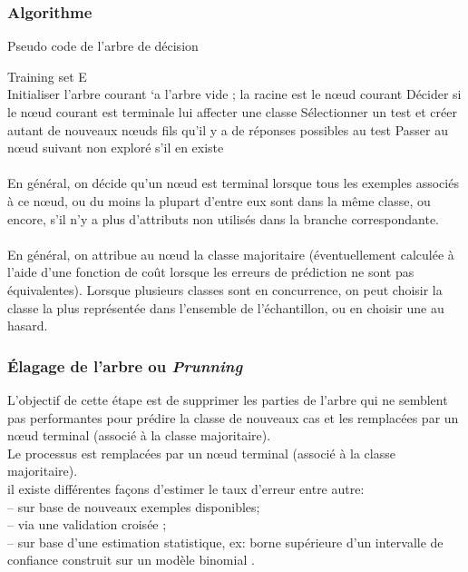 \subsubsection{Algorithme}
\begin{algorithm}
	\caption{Pseudo code de l'arbre de décision}
	\begin{algorithmic}
		\Require 
		Training set E \\
		\State Initialiser l’arbre courant `a l’arbre vide ; la racine est le nœud courant
	    \State Décider si le nœud courant est terminale
	    \State lui affecter une classe 
	    \Else 
	    \State Sélectionner un test et créer autant de nouveaux nœuds fils qu’il y a de réponses possibles au test
	    \EndIf
	    \State Passer au nœud suivant non exploré s’il en existe
	    \EndWhile
		\end{algorithmic}
		\end{algorithm}
\paragraph{}
En général, on décide qu’un nœud est terminal lorsque tous les exemples associés à ce nœud, ou du moins la plupart d’entre eux sont dans la même classe, ou encore, s’il n’y a plus d’attributs non utilisés dans la branche correspondante.
\paragraph{}
En général, on attribue au nœud la classe majoritaire (éventuellement calculée à l’aide d’une fonction de coût lorsque les erreurs de prédiction ne sont pas équivalentes). Lorsque plusieurs classes sont en concurrence, on peut choisir la classe la plus représentée dans l’ensemble de l’échantillon, ou en choisir une au hasard.
\subsubsection{Élagage de l'arbre ou \emph{Prunning}}
L'objectif de cette étape est de supprimer les parties de l'arbre qui ne semblent pas performantes pour
prédire la classe de nouveaux cas et les remplacées par un nœud terminal (associé à la classe majoritaire).\\
Le processus est remplacées par un nœud terminal (associé à la classe majoritaire).\\
il existe différentes façons d'estimer le taux d'erreur entre autre: \\
– sur base de nouveaux exemples disponibles;\\
– via une validation croisée ;\\
– sur base d'une estimation statistique, ex: borne supérieure d'un intervalle de confiance construit sur un modèle binomial .
